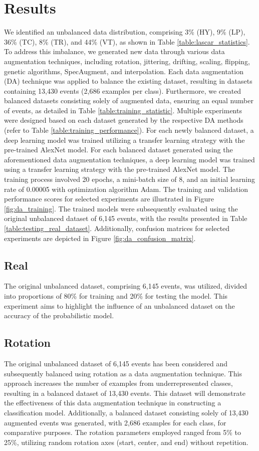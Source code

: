 \documentclass[journal]{IEEEtran}
\begin{document}
\section{Results} \label{results}
We identified an unbalanced data distribution, comprising 3\% (HY), 9\% (LP), 36\% (TC), 8\% (TR), and 44\% (VT), as shown in Table \ref{table:lascar_statistics}. To address this imbalance, we generated new data through various data augmentation techniques, including rotation, jittering, drifting, scaling, flipping, genetic algorithms, SpecAugment, and interpolation. Each data augmentation (DA) technique was applied to balance the existing dataset, resulting in datasets containing 13,430 events (2,686 examples per class). Furthermore, we created balanced datasets consisting solely of augmented data, ensuring an equal number of events, as detailed in Table \ref{table:training_statistic}.
Multiple experiments were designed based on each dataset generated by the respective DA methods (refer to Table \ref{table:training_performance}). For each newly balanced dataset, a deep learning model was trained utilizing a transfer learning strategy with the pre-trained AlexNet model. For each balanced dataset generated using the aforementioned data augmentation techniques, a deep learning model was trained using a transfer learning strategy with the pre-trained AlexNet model. The training process involved 20 epochs, a mini-batch size of 8, and an initial learning rate of 0.00005 with optimization algorithm Adam. The training and validation performance scores for selected experiments are illustrated in Figure \ref{fig:da_training}. The trained models were subsequently evaluated using the original unbalanced dataset of 6,145 events, with the results presented in Table \ref{table:testing_real_dataset}. Additionally, confusion matrices for selected experiments are depicted in Figure \ref{fig:da_confusion_matrix}.

\subsection{Real}
The original unbalanced dataset, comprising 6,145 events, was utilized, divided into proportions of 80\% for training and 20\% for testing the model. This experiment aims to highlight the influence of an unbalanced dataset on the accuracy of the probabilistic model.
\subsection{Rotation}
The original unbalanced dataset of 6,145 events has been considered and subsequently balanced using rotation as a data augmentation technique. This approach increases the number of examples from underrepresented classes, resulting in a balanced dataset of 13,430 events. This dataset will demonstrate the effectiveness of this data augmentation technique in constructing a classification model.
Additionally, a balanced dataset consisting solely of 13,430 augmented events was generated, with 2,686 examples for each class, for comparative purposes.
The rotation parameters employed ranged from 5\% to 25\%, utilizing random rotation axes (start, center, and end) without repetition.
\end{document}
